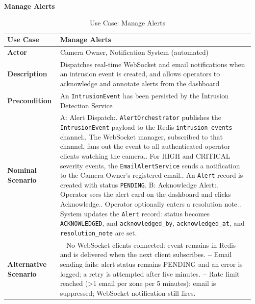 \textbf{Manage Alerts}
\begin{table}[H]
\centering\small
\begin{tabular}{|>{\bfseries}p{3cm}|p{10cm}|}
\hline
Use Case    & Manage Alerts \\ \hline
Actor       & Camera Owner, Notification System (automated) \\ \hline
Description & Dispatches real-time WebSocket and email notifications when an intrusion event is created, and allows operators to acknowledge and annotate alerts from the dashboard \\ \hline
Precondition & An \texttt{IntrusionEvent} has been persisted by the Intrusion Detection Service \\ \hline
Nominal Scenario &
A: Alert Dispatch:\newline
1. \texttt{AlertOrchestrator} publishes the \texttt{IntrusionEvent} payload to the Redis \texttt{intrusion-events} channel.\newline
2. The WebSocket manager, subscribed to that channel, fans out the event to all authenticated operator clients watching the camera.\newline
3. For HIGH and CRITICAL severity events, the \texttt{EmailAlertService} sends a notification to the Camera Owner's registered email.\newline
4. An \texttt{Alert} record is created with status \texttt{PENDING}.\newline
B: Acknowledge Alert:\newline
1. Operator sees the alert card on the dashboard and clicks Acknowledge.\newline
2. Operator optionally enters a resolution note.\newline
3. System updates the \texttt{Alert} record: status becomes \texttt{ACKNOWLEDGED}, and \texttt{acknowledged\_by}, \texttt{acknowledged\_at}, and \texttt{resolution\_note} are set. \\ \hline
Alternative Scenario &
\textbf{--} No WebSocket clients connected: event remains in Redis and is delivered when the next client subscribes.\newline
\textbf{--} Email sending fails: alert status remains PENDING and an error is logged; a retry is attempted after five minutes.\newline
\textbf{--} Rate limit reached (>1 email per zone per 5 minutes): email is suppressed; WebSocket notification still fires. \\ \hline
\end{tabular}
\caption{Use Case: Manage Alerts}
\label{tab:uc_alerts}
\end{table}

